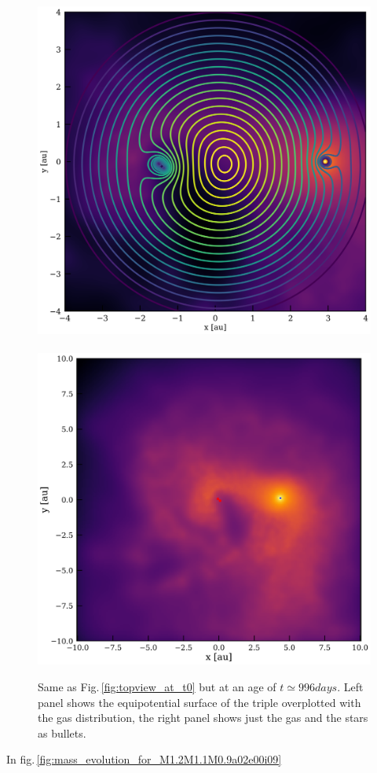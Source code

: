 \documentclass{aastex62}
\begin{document}
\begin{figure}[ht!]
  \includegraphics[width=0.49\columnwidth]{lagrange_points_and_sph.pdf}
~  \includegraphics[width=0.51\columnwidth]{fig_t600_N80000_M012MSun1109MSun_a02au_e00_inc9deg.pdf}
\caption{Same as Fig.\,\ref{fig:topview_at_t0} but at an age of $t
  \simeq 996days$. Left panel shows the equipotential surface of the
  triple overplotted with the gas distribution, the right panel shows
  just the gas and the stars as bullets.
\label{fig:topview_at_t1000day}}
\end{figure}

In fig.\,\ref{fig:mass_evolution_for_M1.2M1.1M0.9a02e00i09}
\end{document}
